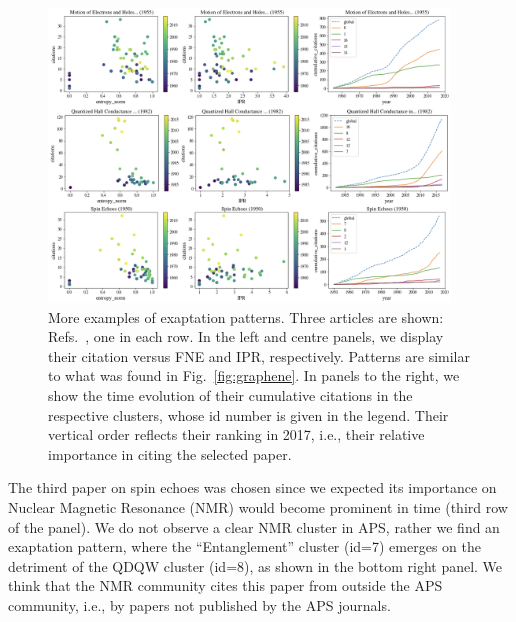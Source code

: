 \documentclass[draft,final]{vutinfth} %
\begin{document}
\begin{figure}[t]
    \centering
    \includegraphics[width=0.95\textwidth]{figures_exaptation/exaptation_examples.png}
    \caption{More examples of exaptation patterns. Three articles are shown: Refs.~\protect\cite{electrons_and_holes,quantized_hall,spin_echoes}, one in each row. In the left and centre panels, we display their citation versus FNE and IPR, respectively. Patterns are similar to what was found in Fig.~\ref{fig:graphene}. In panels to the right, we show the time evolution of their cumulative citations in the respective clusters, whose id number is given in the legend. Their vertical order reflects their ranking in 2017, i.e., their relative importance in citing the selected paper.}
    \label{fig:examples}
\end{figure}

The third paper on spin echoes was chosen since we expected its importance on Nuclear Magnetic Resonance (NMR) would become prominent in time (third row of the panel). 
We do not observe a clear NMR cluster in APS, rather we find an exaptation pattern, where the ``Entanglement'' cluster (id=7) emerges on the detriment of the QDQW cluster (id=8), as shown in the bottom right panel. 
We think that the NMR community cites this paper from outside the APS community, i.e., by papers not published by the APS journals.
%
\end{document}
